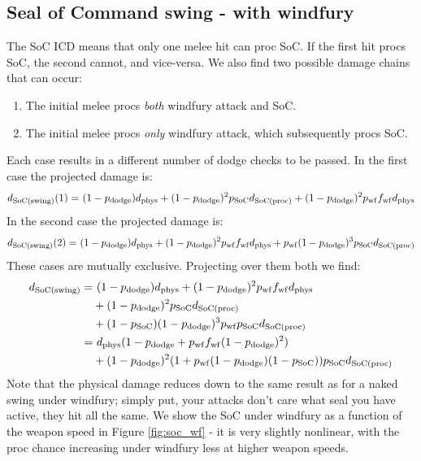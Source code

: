 \subsection{Seal of Command swing - with windfury}
The SoC ICD means that only one melee hit can proc SoC.
If the first hit procs SoC, the second cannot, and vice-versa.
We also find two possible damage chains that can occur:
\begin{enumerate}
	\item The initial melee procs \emph{both} windfury attack and SoC.
	\item The initial melee procs \emph{only} windfury attack, which subsequently procs SoC.
\end{enumerate}
Each case results in a different number of dodge checks to be passed.
In the first case the projected damage is:
\begin{equation*}
	\begin{aligned}
		d_\mathrm{SoC(swing)}  (1) =&~ (1-p_{\mathrm{dodge}} ) d_{\mathrm{phys}}  + (1-p_{\mathrm{dodge}} )^2 p_\mathrm{SoC}  d_\mathrm{SoC(proc)}  + (1-p_{\mathrm{dodge}} )^2 p_{\mathrm{wf}}  f_{\mathrm{wf}}  d_{\mathrm{phys}} \\
	\end{aligned}
\end{equation*}
In the second case the projected damage is:
\begin{equation*}
	\begin{aligned}
		d_\mathrm{SoC(swing)}  (2) =&~ (1-p_{\mathrm{dodge}} ) d_{\mathrm{phys}}  + (1-p_{\mathrm{dodge}} )^2 p_{\mathrm{wf}}  f_{\mathrm{wf}}  d_{\mathrm{phys}}  + p_{\mathrm{wf}}  (1-p_{\mathrm{dodge}} )^3 p_\mathrm{SoC}  d_\mathrm{SoC(proc)} \\
	\end{aligned}
\end{equation*}
These cases are mutually exclusive. Projecting over them both we find:
\begin{equation*}
	\begin{aligned}
		d_\mathrm{SoC(swing)}  =&~ (1-p_{\mathrm{dodge}} ) d_{\mathrm{phys}}  + (1-p_{\mathrm{dodge}} )^2 p_{\mathrm{wf}}  f_{\mathrm{wf}}  d_{\mathrm{phys}}  \\
		&+ (1-p_{\mathrm{dodge}} )^2 p_\mathrm{SoC}  d_\mathrm{SoC(proc)}  \\
		&+ (1-p_\mathrm{SoC}  )(1-p_{\mathrm{dodge}} )^3 p_{\mathrm{wf}}  p_\mathrm{SoC}   d_\mathrm{SoC(proc)}  \\
		=&~  d_{\mathrm{phys}} (1 - p_{\mathrm{dodge}}  + p_{\mathrm{wf}} f_{\mathrm{wf}} (1 -p_{\mathrm{dodge}} )^2) \\
		&+ (1-p_{\mathrm{dodge}} )^2 (1+p_{\mathrm{wf}} (1-p_{\mathrm{dodge}} )(1-p_\mathrm{SoC}  )) p_\mathrm{SoC}  d_\mathrm{SoC(proc)}  
	\end{aligned}
\end{equation*}
Note that the physical damage reduces down to the same result as for a naked swing under windfury; simply put, your attacks don't care what seal you have active, they hit all the same. We show the SoC under windfury as a function of the weapon speed in Figure \ref{fig:soc_wf} - it is very slightly nonlinear, with the proc chance increasing under windfury less at higher weapon speeds.

